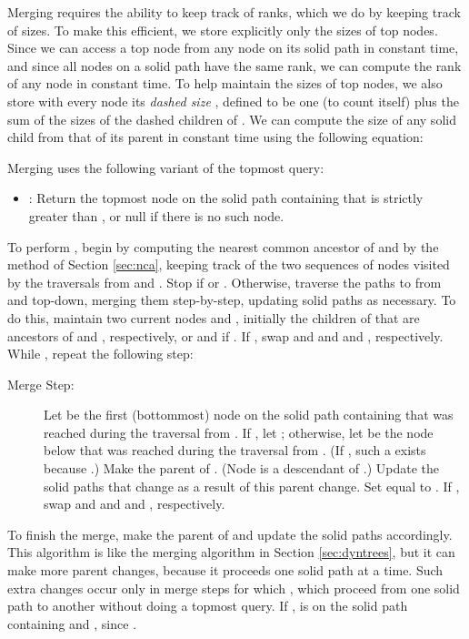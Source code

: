 \documentclass[twoside,leqno,twocolumn]{article}
\begin{document}
Merging requires the ability to keep track of ranks, which we do by keeping track of sizes.  To make this efficient, we store explicitly
only the sizes of top nodes.  Since we can access a top node from any node on its solid path in constant time, and since all nodes on a solid path have the same rank, we can compute the rank of any node in constant time.  To help maintain the sizes of top nodes, we also store with every node  its \emph{dashed size} , defined to be one (to count  itself) plus the sum of the sizes of the dashed children of . We can compute the size of any solid child  from that of its parent in constant time using the following equation:



Merging uses the following variant of the topmost query:

\begin{itemize}
\item : Return the topmost node on the solid path containing  that is strictly greater than , or null if there is no such node.
\end{itemize}

To perform , begin by computing the nearest common ancestor  of  and  by the method of Section \ref{sec:nca}, keeping track of the two sequences of nodes visited by the traversals from  and . Stop if  or . Otherwise, traverse the paths to  from  and  top-down, merging them step-by-step, updating solid paths as necessary. To do this, maintain two current nodes  and , initially the children of  that are ancestors of  and , respectively, or  and  if .  If , swap  and  and  and , respectively.  While , repeat the following step:
\begin{description}
\item[Merge Step:] Let  be the first (bottommost) node on the solid path containing  that was reached during the traversal from .  If , let ; otherwise, let  be the node below  that was reached during the traversal from .  (If , such a  exists because .)  Make  the parent of . (Node  is a descendant of .)  Update the solid paths that change as a result of this parent change.  Set  equal to .  If , swap  and  and  and , respectively.
\end{description}
To finish the merge, make  the parent of  and update the solid paths accordingly.\\


This algorithm is like the merging algorithm in Section \ref{sec:dyntrees}, but it can make more parent changes, because it proceeds one solid path at a time.  Such extra changes occur only in merge steps for which , which proceed from one solid path to another without doing a topmost query.  If ,  is on the solid path containing  and , since .
\end{document}
